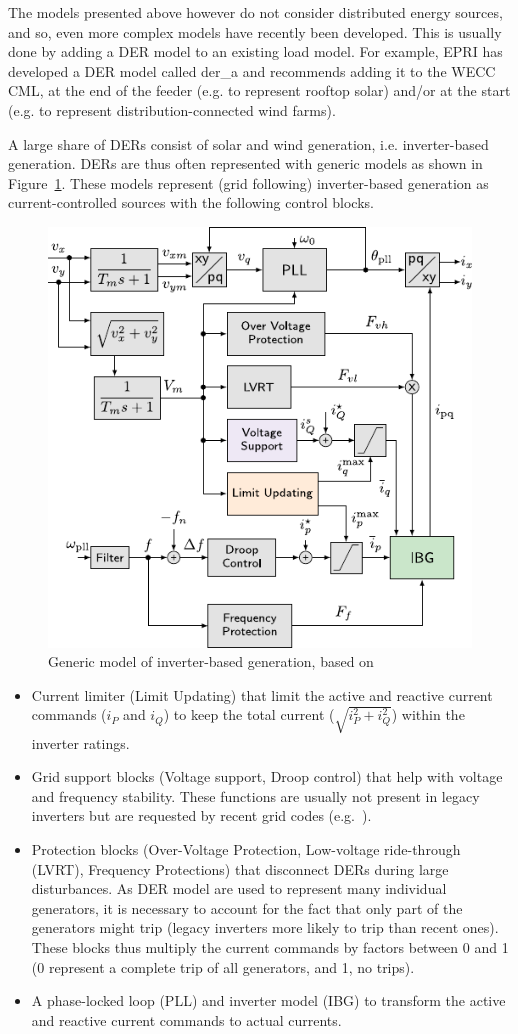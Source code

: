 The models presented above however do not consider distributed energy sources, and so, even more complex models have recently been developed. This is usually done by adding a DER model to an existing load model. For example, EPRI has developed a DER model called der\_a and recommends adding it to the WECC CML, at the end of the feeder (e.g. to represent rooftop solar) and/or at the start (e.g. to represent distribution-connected wind farms).

A large share of DERs consist of solar and wind generation, i.e. inverter-based generation. DERs are thus often represented with generic models as shown in Figure~\ref{fig:IBG}. These models represent (grid following) inverter-based generation as current-controlled sources with the following control blocks.

\begin{figure}
    \centering
    \includegraphics[width=0.6\linewidth]{Figs/IBG.pdf}
    \caption{Generic model of inverter-based generation, based on~\cite{Vorwerk}}
    \label{fig:IBG}
\end{figure}

\begin{itemize}
    \item Current limiter (Limit Updating) that limit the active and reactive current commands (\(i_P\) and \(i_Q\)) to keep the total current (\(\sqrt{i_P^2 + i_Q^2}\)) within the inverter ratings.
    \item Grid support blocks (Voltage support, Droop control) that help with voltage and frequency stability. These functions are usually not present in legacy inverters but are requested by recent grid codes (e.g.~\cite{G99}).
    \item Protection blocks (Over-Voltage Protection, Low-voltage ride-through (LVRT), Frequency Protections) that disconnect DERs during large disturbances. As DER model are used to represent many individual generators, it is necessary to account for the fact that only part of the generators might trip (legacy inverters more likely to trip than recent ones). These blocks thus multiply the current commands by factors between 0 and 1 (0 represent a complete trip of all generators, and 1, no trips).
    \item A phase-locked loop (PLL) and inverter model (IBG) to transform the active and reactive current commands to actual currents.
\end{itemize}

